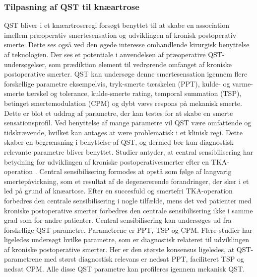 \subsubsection{Tilpasning af QST til knæartrose}
QST bliver i et knæartroseregi forsøgt benyttet til at skabe en association imellem præoperativ smertesensation og udviklingen af kronisk postoperativ smerte. Dette ses også ved den øgede interesse omhandlende kirurgisk benyttelse af teknologien. Der ses et potentiale i anvendelsen af præoperative QST-undersøgelser, som prædiktion element til vedrørende omfanget af kroniske postoperative smerter. \citep{Wylde2013} \citep{Lunn2013} QST kan undersøge denne smertesensation igennem flere forskellige parametre eksempelvis, tryk-smerte tærskelen (PPT), kulde- og varme-smerte tærskel og tolerance, kulde-smerte rating, temporal summation (TSP), betinget smertemodulation (CPM) og dybt vævs respons på mekanisk smerte. \citep{Cornelius2015} Dette er blot et uddrag af parametre, der kan testes for at skabe en smerte sensationsprofil. Ved benyttelse af mange parametre vil QST være omfattende og tidskrævende, hvilket kan antages at være problematisk i et klinisk regi. Dette skaber en begrænsning i benyttelse af QST, og dermed bør kun diagnostisk relevante parametre bliver benyttet. \citep{Lunn2013} Studier antyder, at central sensibilisering har betydning for udviklingen af kroniske postoperativesmerter efter en TKA-operation \citep{Suokas2012}. Central sensibilisering formodes at opstå som følge af langvarig smertepåvirkning, som et resultat af de degenererende forandringer, der sker i et led på grund af knæartose. \citep{Arendt-Nielsen2015b} Efter en succesfuld og smertefri TKA-operation forbedres den centrale sensibilisering i nogle tilfælde, mens det ved patienter med kroniske postoperative smerter forbedres den centrale sensibilisering ikke i samme grad som for andre patienter. \citep{Arendt-Nielsen2015b} Central sensibilisering kan undersøges ud fra forskellige QST-parametre. Parametrene er PPT, TSP og CPM. \citep{Arendt-Nielsen2015b} Flere studier har ligeledes undersøgt hvilke parametre, som er diagnostisk relateret til udviklingen af kroniske postoperative smerter. Her er den største konsensus ligeledes, at QST-parametrene med størst diagnostisk relevans er nedsat PPT, faciliteret TSP og nedsat CPM. Alle disse QST parametre kan profileres igennem mekanisk QST. \citep{Petersen2015} \citep{Petersen2016} \citep{Wylde2015} \\
